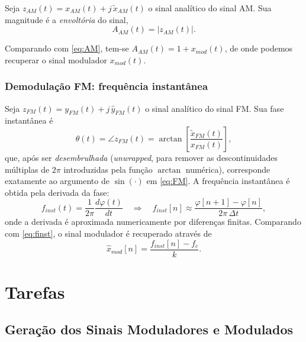 \documentclass[a4paper,twoside,12pt]{article}
\begin{document}
	Seja $z_{AM}(t) = x_{AM}(t) + j\, \tilde{x}_{AM}(t)$ o sinal analítico do sinal AM. Sua magnitude é a \emph{envoltória} do sinal,
	\begin{equation}
		A_{AM}(t) = \left| z_{AM}(t) \right|.
	\end{equation}
	
	Comparando com \eqref{eq:AM}, tem-se $A_{AM}(t) = 1 + x_{mod}(t)$, de onde podemos recuperar o sinal modulador $x_{mod}(t)$.
	
	\subsubsection{Demodulação FM: frequência instantânea}
	
	Seja $z_{FM}(t) = y_{FM}(t) + j\, \hat{y}_{FM}(t)$ o sinal analítico do sinal FM. Sua fase instantânea é
	\begin{equation}
		\theta(t) = \angle z_{FM}(t) = \arctan\left[\frac{\tilde{x}_{FM}(t)}{x_{FM}(t)}\right],
	\end{equation}
	que, após ser \emph{desembrulhada} (\emph{unwrapped}, para remover as descontinuidades múltiplas de $2\pi$ introduzidas pela função $\arctan$ numérica), corresponde exatamente ao argumento de $\sin(\cdot)$ em \eqref{eq:FM}. A frequência instantânea é obtida pela derivada da fase:
	\begin{equation}
		f_{inst}(t) = \frac{1}{2\pi} \frac{d\varphi(t)}{dt} \quad \Longrightarrow \quad f_{inst}[n] \approx \frac{\varphi[n+1] - \varphi[n]}{2\pi\, \Delta t},
	\end{equation}
	onde a derivada é aproximada numericamente por diferenças finitas. Comparando com \eqref{eq:finst}, o sinal modulador é recuperado através de
	\begin{equation}
		\hat{x}_{mod}[n] = \frac{f_{inst}[n] - f_c}{k}.
	\end{equation}
	
	
	\section{Tarefas}
	\label{sec:tarefas}
	
	\subsection{Geração dos Sinais Moduladores e Modulados}
	\label{sec:tarefas1}
	
\end{document}
